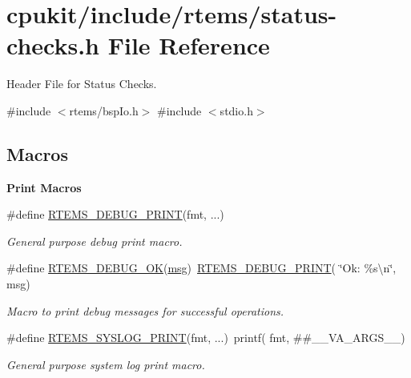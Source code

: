 \hypertarget{status-checks_8h}{}\section{cpukit/include/rtems/status-\/checks.h File Reference}
\label{status-checks_8h}


Header File for Status Checks.  


{\ttfamily \#include $<$rtems/bsp\+Io.\+h$>$}\newline
{\ttfamily \#include $<$stdio.\+h$>$}\newline
\subsection*{Macros}
\begin{Indent}\textbf{ Print Macros}\par
\begin{DoxyCompactItemize}
\item 
\#define \mbox{\hyperlink{group__rtems__status__checks_ga6547588daa5fbd983b3c395d97f81db7}{R\+T\+E\+M\+S\+\_\+\+D\+E\+B\+U\+G\+\_\+\+P\+R\+I\+NT}}(fmt, ...)
\begin{DoxyCompactList}\small\item\em General purpose debug print macro. \end{DoxyCompactList}\item 
\#define \mbox{\hyperlink{group__rtems__status__checks_ga1f4955118d6ae4aa4839c970bbcca2d6}{R\+T\+E\+M\+S\+\_\+\+D\+E\+B\+U\+G\+\_\+\+OK}}(\mbox{\hyperlink{structmsg}{msg}})~\mbox{\hyperlink{group__rtems__status__checks_ga6547588daa5fbd983b3c395d97f81db7}{R\+T\+E\+M\+S\+\_\+\+D\+E\+B\+U\+G\+\_\+\+P\+R\+I\+NT}}( \char`\"{}Ok\+: \%s\textbackslash{}n\char`\"{}, msg)
\begin{DoxyCompactList}\small\item\em Macro to print debug messages for successful operations. \end{DoxyCompactList}\item 
\#define \mbox{\hyperlink{group__rtems__status__checks_gae6366e5dd71c9ba9d8cd7d3688b2f6ef}{R\+T\+E\+M\+S\+\_\+\+S\+Y\+S\+L\+O\+G\+\_\+\+P\+R\+I\+NT}}(fmt, ...)~printf( fmt, \#\#\+\_\+\+\_\+\+V\+A\+\_\+\+A\+R\+G\+S\+\_\+\+\_\+)
\begin{DoxyCompactList}\small\item\em General purpose system log print macro. \end{DoxyCompactList}\item 

\end{DoxyCompactItemize}
\end{Indent}
